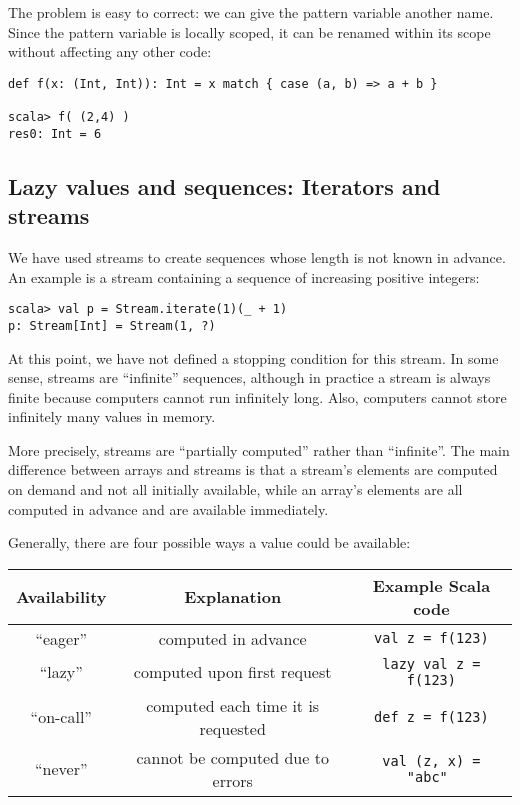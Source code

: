 The problem is easy to correct: we can give the pattern variable another
name. Since the pattern variable is locally scoped, it can be renamed
within its scope without affecting any other code:
\begin{lstlisting}
def f(x: (Int, Int)): Int = x match { case (a, b) => a + b }

scala> f( (2,4) )
res0: Int = 6
\end{lstlisting}


\subsection{Lazy values and sequences: Iterators and streams\label{subsec:Lazy-values-iterators-and-streams}}

We have used streams to create sequences whose length is not known
in advance. An example is a stream containing a sequence of increasing
positive integers:
\begin{lstlisting}
scala> val p = Stream.iterate(1)(_ + 1)
p: Stream[Int] = Stream(1, ?)
\end{lstlisting}
At this point, we have not defined a stopping condition for this stream.
In some sense, streams are ``infinite'' sequences, although in practice
a stream is always finite because computers cannot run infinitely
long. Also, computers cannot store infinitely many values in memory. 

More precisely, streams are ``partially computed'' rather than ``infinite''.
The main difference between arrays and streams is that a stream's
elements are computed on demand and not all initially available, while
an array's elements are all computed in advance and are available
immediately.

Generally, there are four possible ways a value could be available:
\begin{center}
\begin{tabular}{|c|c|c|}
\hline 
\textbf{\small{}Availability} & \textbf{\small{}Explanation} & \textbf{\small{}Example Scala code}\tabularnewline
\hline 
\hline 
{\small{}``eager\index{eager value}''} & {\small{}computed in advance} & {\small{}}\lstinline!val z = f(123)!\tabularnewline
\hline 
{\small{}``lazy''} & {\small{}computed upon first request} & {\small{}}\lstinline!lazy val z = f(123)!\tabularnewline
\hline 
{\small{}``on-call''} & {\small{}computed each time it is requested} & {\small{}}\lstinline!def z = f(123)!\tabularnewline
\hline 
{\small{}``never''} & {\small{}cannot be computed due to errors} & {\small{}}\lstinline!val (z, x) = "abc" !\tabularnewline
\hline 
\end{tabular}
\par\end{center}


